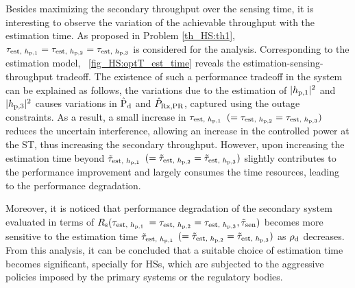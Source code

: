 Besides maximizing the secondary throughput over the sensing time, it is interesting to observe the variation of the achievable throughput with the estimation time.
As proposed in Problem \ref{th_HS:th1}, $\tau_{\text{est, $h_{\text{p,1}}$}} = \tau_{\text{est, $h_{\text{p,2}}$}} = \tau_{\text{est, $h_{\text{p,3}}$}}$ is considered for the analysis. Corresponding to the estimation model, \figurename~\ref{fig_HS:optT_est_time} reveals the estimation-sensing-throughput tradeoff. The existence of such a performance tradeoff in the system can be explained as follows, the variations due to the estimation of $|h_{\text{p,1}}|^2$ and $|h_{\text{p,3}}|^2$ causes variations in $\hat{\text{P}}_{\text{d}}$ and $\hat{P}_{\text{Rx,PR}}$, captured using the outage constraints. As a result, a small increase in $\tau_{\text{est, $h_{\text{p,1}}$}}$ $(= \tau_{\text{est, $h_{\text{p,2}}$}} = \tau_{\text{est, $h_{\text{p,3}}$}})$ reduces the uncertain interference, allowing an increase in the controlled power at the ST, thus increasing the secondary throughput. However, upon increasing the estimation time beyond $\tilde{\tau}_{\text{est, $h_{\text{p,1}}$}}$ $(= \tilde{\tau}_{\text{est, $h_{\text{p,2}}$}}= \tilde{\tau}_{\text{est, $h_{\text{p,3}}$}})$ slightly contributes to the performance improvement and largely consumes the time resources, leading to the performance degradation. 

Moreover, it is noticed that performance degradation of the secondary system evaluated in terms of $R_{\text{s}}(\tau_{\text{est, $h_{\text{p,1}}$}}$ $= \tau_{\text{est, $h_{\text{p,2}}$}} = \tau_{\text{est, $h_{\text{p,3}}$}}, \tilde{\tau}_{\text{sen}})$ becomes more sensitive to the estimation time $\tilde{\tau}_{\text{est, $h_{\text{p,1}}$}}$ $(= \tilde{\tau}_{\text{est, $h_{\text{p,2}}$}}= \tilde{\tau}_{\text{est, $h_{\text{p,3}}$}})$ as $\rho_{\text{d}}$ decreases. From this analysis, it can be concluded that a suitable choice of estimation time becomes significant, specially for HSs, which are subjected to the aggressive policies imposed by the primary systems or the regulatory bodies. 


